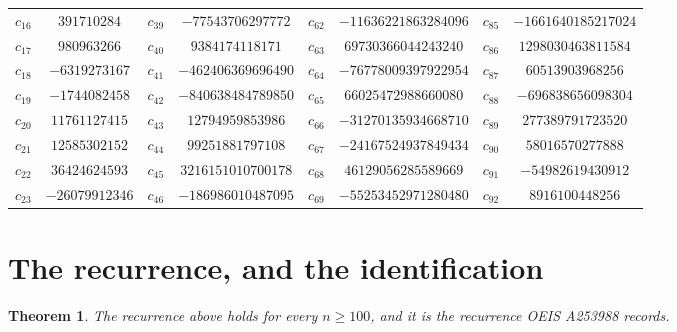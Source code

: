 \documentclass[11pt,a4paper]{article}
\theoremstyle{plain}
\newtheorem{theorem}{Theorem}
\theoremstyle{definition}
\begin{document}
\begin{center}
\begin{tabular}{cccccccc}
$c_{16}$ & $391710284$ & $c_{39}$ & $-77543706297772$ & $c_{62}$ & $-11636221863284096$ & $c_{85}$ & $-1661640185217024$ \\
$c_{17}$ & $980963266$ & $c_{40}$ & $9384174118171$ & $c_{63}$ & $69730366044243240$ & $c_{86}$ & $1298030463811584$ \\
$c_{18}$ & $-6319273167$ & $c_{41}$ & $-462406369696490$ & $c_{64}$ & $-76778009397922954$ & $c_{87}$ & $60513903968256$ \\
$c_{19}$ & $-1744082458$ & $c_{42}$ & $-840638484789850$ & $c_{65}$ & $66025472988660080$ & $c_{88}$ & $-696838656098304$ \\
$c_{20}$ & $11761127415$ & $c_{43}$ & $12794959853986$ & $c_{66}$ & $-31270135934668710$ & $c_{89}$ & $277389791723520$ \\
$c_{21}$ & $12585302152$ & $c_{44}$ & $99251881797108$ & $c_{67}$ & $-24167524937849434$ & $c_{90}$ & $58016570277888$ \\
$c_{22}$ & $36424624593$ & $c_{45}$ & $3216151010700178$ & $c_{68}$ & $46129056285589669$ & $c_{91}$ & $-54982619430912$ \\
$c_{23}$ & $-26079912346$ & $c_{46}$ & $-186986010487095$ & $c_{69}$ & $-55253452971280480$ & $c_{92}$ & $8916100448256$ \\
\end{tabular}
\end{center}

\section{The recurrence, and the identification}

\begin{theorem}
The recurrence above holds for every $n\ge100$, and it is the recurrence OEIS A253988 records.
\end{theorem}
\end{document}
